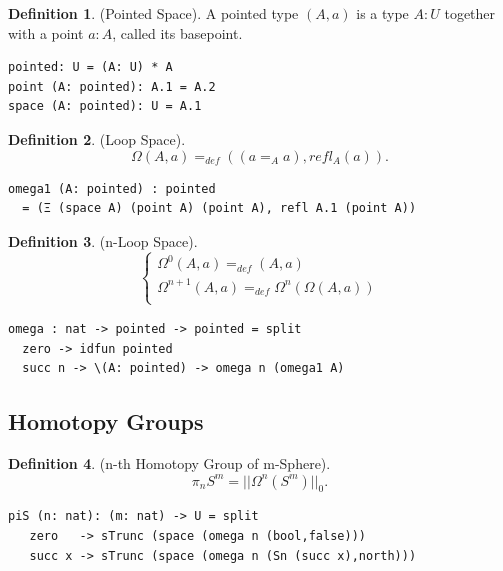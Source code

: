 \documentclass{article}
\theoremstyle{definition}
\newtheorem{definition}{Definition}
\begin{document}
\begin{definition} (Pointed Space). A pointed type $(A,a)$ is a type $A:U$
together with a point $a:A$, called its basepoint.
\begin{lstlisting}
pointed: U = (A: U) * A
point (A: pointed): A.1 = A.2
space (A: pointed): U = A.1
\end{lstlisting}
\end{definition}

\begin{definition} (Loop Space).
$$\Omega(A,a) =_{def} ((a =_A a), refl_A(a)).$$
\begin{lstlisting}
omega1 (A: pointed) : pointed
  = (Ξ (space A) (point A) (point A), refl A.1 (point A))
\end{lstlisting}
\end{definition}

\begin{definition} (n-Loop Space).
$$
\begin{cases}
\Omega^0(A, a) =_{def} (A, a)\\
\Omega^{n+1}(A,a) =_{def} \Omega^{n}(\Omega(A,a))\\
\end{cases}
$$
\begin{lstlisting}
omega : nat -> pointed -> pointed = split
  zero -> idfun pointed
  succ n -> \(A: pointed) -> omega n (omega1 A)
\end{lstlisting}
\end{definition}

\newpage
\subsection{Homotopy Groups}

\begin{definition} (n-th Homotopy Group of m-Sphere).
$$\pi_{n}S^{m} = ||\Omega^{n}(S^{m})||_0.$$
\begin{lstlisting}
piS (n: nat): (m: nat) -> U = split
   zero   -> sTrunc (space (omega n (bool,false)))
   succ x -> sTrunc (space (omega n (Sn (succ x),north)))
\end{lstlisting}
\end{definition}
\end{document}
